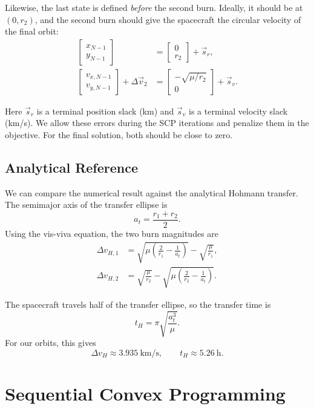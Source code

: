 \documentclass{article}
\begin{document}
Likewise, the last state is defined \emph{before} the second burn. Ideally, it should be at $(0,r_2)$, and the second burn should give the spacecraft the circular velocity of the final orbit:
\begin{align*}
\begin{bmatrix}x_{N-1}\\y_{N-1}\end{bmatrix}
&=\begin{bmatrix}0\\r_2\end{bmatrix}+\vec{s}_r,\\
\begin{bmatrix}v_{x,N-1}\\v_{y,N-1}\end{bmatrix}+\Delta\vec{v}_2
&=\begin{bmatrix}-\sqrt{\mu/r_2}\\0\end{bmatrix}+\vec{s}_v.
\end{align*}

Here $\vec{s}_r$ is a terminal position slack (km) and $\vec{s}_v$ is a terminal velocity slack (km/s). We allow these errors during the SCP iterations and penalize them in the objective. For the final solution, both should be close to zero.

\subsection{Analytical Reference}

We can compare the numerical result against the analytical Hohmann transfer. The semimajor axis of the transfer ellipse is
\[
a_t=\frac{r_1+r_2}{2}.
\]
Using the vis-viva equation, the two burn magnitudes are
\begin{align*}
\Delta v_{H,1}
&=\sqrt{\mu\left(\frac{2}{r_1}-\frac{1}{a_t}\right)}
 -\sqrt{\frac{\mu}{r_1}},\\
\Delta v_{H,2}
&=\sqrt{\frac{\mu}{r_2}}
 -\sqrt{\mu\left(\frac{2}{r_2}-\frac{1}{a_t}\right)}.
\end{align*}

The spacecraft travels half of the transfer ellipse, so the transfer time is
\[
t_H=\pi\sqrt{\frac{a_t^3}{\mu}}.
\]
For our orbits, this gives
\[
\boxed{\Delta v_H\approx3.935\ \mathrm{km/s},\qquad t_H\approx5.26\ \mathrm{h}.}
\]

\section{Sequential Convex Programming}
\end{document}
